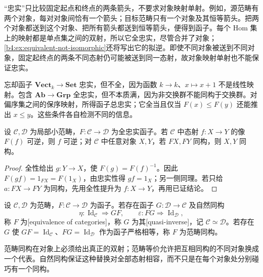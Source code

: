 \ProseParagraphBreak
“忠实”只比较固定起点和终点的两条箭头，不要求对象映射单射。例如，源范畴有两个对象，每对对象间恰有一个箭头；目标范畴只有一个对象及其恒等箭头。把两个对象都送到这个对象、把所有箭头都送到恒等箭头，便得到函子。每个 Hom 集上的映射都是单点集之间的双射，所以它全忠实，尽管合并了对象；\cref{b4:ex:equivalent-not-isomorphic}还将写出它的拟逆。即使不同对象被送到不同对象，固定起终点的两条不同态射仍可能被送到同一态射，故对象映射单射也不能保证忠实。

\ProseParagraphBreak
忘却函子 \(\mathbf{Vect}_k\rightarrow\mathbf{Set}\) 忠实，但不全，因为函数 \(k\rightarrow k\)、\(x\mapsto x+1\) 不是线性映射。包含 \(\mathbf{Ab}\rightarrow\mathbf{Grp}\) 全忠实，但不本质满，因为非交换群不能同构于交换群。对偏序集之间的保序映射，所得函子总忠实；它全当且仅当 \(F(x)\le F(y)\) 还能推出 \(x\le y\)。这些条件各自检测不同的信息。

\begin{proposition}\label{b4:prop:fully-faithful-reflects-isomorphisms}
	设 \(\mathcal C,\mathcal D\) 为局部小范畴，\(F:\mathcal C\rightarrow\mathcal D\) 为全忠实函子。若 \(\mathcal C\) 中态射 \(f:X\rightarrow Y\) 的像 \(F(f)\) 可逆，则 \(f\) 可逆；对 \(\mathcal C\) 中任意对象 \(X,Y\)，若 \(FX,FY\) 同构，则 \(X,Y\) 同构。
\end{proposition}
\begin{proof}
	全性给出 \(g:Y\rightarrow X\)，使 \(F(g)=F(f)^{-1}\)。因此 \(F(gf)=1_{FX}=F(1_X)\)，由忠实性得 \(gf=1_X\)；另一侧同理。若只给 \(a:FX\rightarrow FY\) 为同构，先用全性提升为 \(f:X\rightarrow Y\)，再用已证结论。
\end{proof}

\begin{definition}\label{b4:def:equivalence}
	设 \(\mathcal C,\mathcal D\) 为范畴，\(F:\mathcal C\rightarrow\mathcal D\) 为函子。若存在函子 \(G:\mathcal D\rightarrow\mathcal C\) 及自然同构
	\[
		\eta:\operatorname{Id}_{\mathcal C}\Rightarrow GF,\qquad \varepsilon:FG\Rightarrow\operatorname{Id}_{\mathcal D},
	\]
	称 \(F\) 为[equivalence of categories]，称 \(G\) 为其[quasi-inverse]，记 \(\mathcal C\simeq\mathcal D\)。若存在 \(G\) 使 \(GF=\operatorname{Id}_{\mathcal C}\)、\(FG=\operatorname{Id}_{\mathcal D}\) 作为函子严格相等，称 \(F\) 为范畴同构。
\end{definition}

范畴同构在对象上必须给出真正的双射；范畴等价允许把互相同构的不同对象换成一个代表。自然同构保证这种替换对全部态射相容，而不只是在每个对象处分别碰巧有一个同构。

